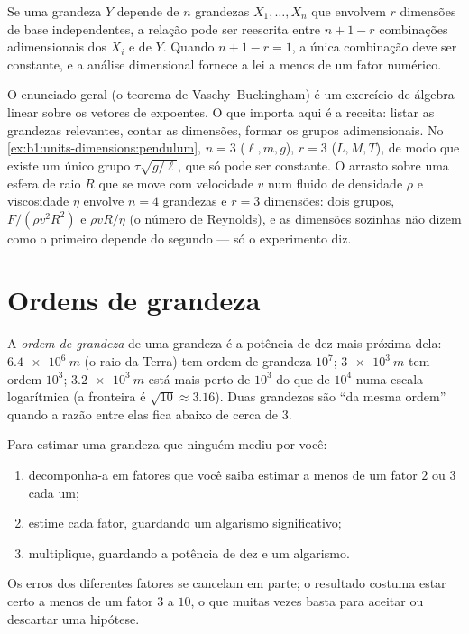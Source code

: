 \begin{proposition}\label{prop:b1:units-dimensions:pi}
Se uma grandeza $Y$ depende de $n$ grandezas $X_1, \dots, X_n$ que
envolvem $r$ dimensões de base independentes, a relação pode ser reescrita
entre $n + 1 - r$ combinações adimensionais dos $X_i$ e de $Y$.
Quando $n + 1 - r = 1$, a única combinação deve ser constante, e a
análise dimensional fornece a lei a menos de um fator numérico.
\end{proposition}
\admitted

\begin{remark}\label{rem:b1:units-dimensions:pi}
O enunciado geral (o teorema de Vaschy--Buckingham) é um exercício de
álgebra linear sobre os vetores de expoentes. O que importa aqui é a
receita: listar as grandezas relevantes, contar as dimensões, formar os
grupos adimensionais. No \cref{ex:b1:units-dimensions:pendulum}, $n = 3$
($\ell, m, g$), $r = 3$ ($L, M, T$), de modo que existe um único grupo
$\tau\sqrt{g/\ell}$, que só pode ser constante. O arrasto sobre uma esfera
de raio $R$ que se move com velocidade $v$ num fluido de densidade $\rho$ e
viscosidade $\eta$ envolve $n = 4$ grandezas e $r = 3$ dimensões: dois
grupos, $F/(\rho v^2 R^2)$ e $\rho v R/\eta$ (o número de Reynolds), e as
dimensões sozinhas não dizem como o primeiro depende do segundo --- só o
experimento diz.
\end{remark}

\section{Ordens de grandeza}

\begin{definition}\label{def:b1:units-dimensions:oom}
A \emph{ordem de grandeza} de uma grandeza é a potência de dez mais
próxima dela: $\qty{6.4e6}{m}$ (o raio da Terra) tem ordem de grandeza
$10^7$; $\qty{3e3}{m}$ tem ordem $10^3$; $\qty{3.2e3}{m}$ está mais perto
de $10^3$ do que de $10^4$ numa escala logarítmica (a fronteira é
$\sqrt{10} \approx 3.16$). Duas grandezas são ``da mesma ordem'' quando a
razão entre elas fica abaixo de cerca de $3$.
\end{definition}

\begin{method}[Estimando]\label{met:b1:units-dimensions:estimate}
Para estimar uma grandeza que ninguém mediu por você:
\begin{enumerate}
  \item decomponha-a em fatores que você saiba estimar a menos de um fator
        $2$ ou $3$ cada um;
  \item estime cada fator, guardando um algarismo significativo;
  \item multiplique, guardando a potência de dez e um algarismo.
\end{enumerate}
Os erros dos diferentes fatores se cancelam em parte; o resultado costuma
estar certo a menos de um fator $3$ a $10$, o que muitas vezes basta para
aceitar ou descartar uma hipótese.
\end{method}


